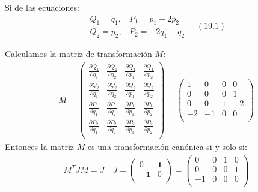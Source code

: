 \documentclass[a4paper]{article}
\begin{document}
    \begin{answer}[Punto 19]
        Si de las ecuaciones:
        $$
        \begin{array}{cl}
        Q_1=q_1, & P_1=p_1-2 p_2 \\
        Q_2=p_2, & P_2=-2 q_1-q_2
        \end{array} \quad (19.1)
        $$

        Calculamos la matriz de transformación $M$:
        \begin{align*}
            M = \begin{pmatrix}
                \frac{\partial Q_1}{\partial q_1} & \frac{\partial Q_1}{\partial q_2} & \frac{\partial Q_1}{\partial p_1} & \frac{\partial Q_1}{\partial p_2}\\
                \frac{\partial Q_2}{\partial q_1} & \frac{\partial Q_2}{\partial q_2} & \frac{\partial Q_2}{\partial p_1} & \frac{\partial Q_2}{\partial p_2}\\
                \frac{\partial P_1}{\partial q_1} & \frac{\partial P_1}{\partial q_2} & \frac{\partial P_1}{\partial p_1} & \frac{\partial P_1}{\partial p_2}\\
                \frac{\partial P_2}{\partial q_1} & \frac{\partial P_2}{\partial q_2} & \frac{\partial P_2}{\partial p_1} & \frac{\partial P_2}{\partial p_2}\\
            \end{pmatrix} = \begin{pmatrix}
                1 & 0 & 0 & 0\\
                0 & 0 & 0 & 1\\
                0 & 0 & 1 & -2\\
                -2 & -1 & 0 & 0\\
            \end{pmatrix}
        \end{align*}
        Entonces la matriz $M$ es una transformación canónica si y solo si:
        \begin{align*}
            M^T J M = J \quad J = \begin{pmatrix}
                0 & \mathbf 1\\
                -\mathbf 1 & 0\\
            \end{pmatrix} = \begin{pmatrix}
                0 & 0 & 1 & 0\\
                0 & 0 & 0 & 1\\
                -1 & 0 & 0 & 0\\

\end{pmatrix}
\end{align*}
\end{answer}
\end{document}
